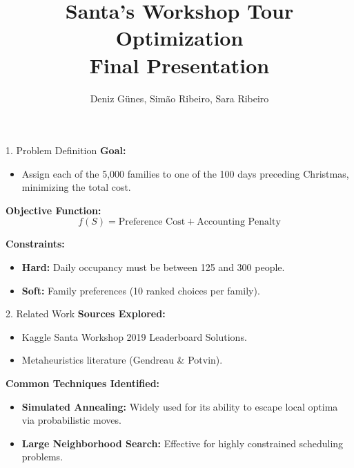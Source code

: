\documentclass[aspectratio=169]{beamer}
\title{Santa's Workshop Tour Optimization\\Final Presentation}
\author{Deniz Günes, Simão Ribeiro, Sara Ribeiro}
\begin{document}
\frame{\titlepage}

\begin{frame}{1. Problem Definition}
\textbf{Goal:}
\begin{itemize}
    \item Assign each of the 5,000 families to one of the 100 days preceding Christmas, minimizing the total cost.
\end{itemize}

\textbf{Objective Function:}
\[
f(S) = \text{Preference Cost} + \text{Accounting Penalty}
\]

\textbf{Constraints:}
\begin{itemize}
    \item \textbf{Hard:} Daily occupancy must be between 125 and 300 people.
    \item \textbf{Soft:} Family preferences (10 ranked choices per family).
\end{itemize}
\end{frame}

\begin{frame}{2. Related Work}
\textbf{Sources Explored:}
\begin{itemize}
    \item Kaggle Santa Workshop 2019 Leaderboard Solutions.
    \item Metaheuristics literature (Gendreau \& Potvin).
\end{itemize}

\textbf{Common Techniques Identified:}
\begin{itemize}
    \item \textbf{Simulated Annealing:} Widely used for its ability to escape local optima via probabilistic moves.
    \item \textbf{Large Neighborhood Search:} Effective for highly constrained scheduling problems.
\end{itemize}
\end{frame}
\end{document}

